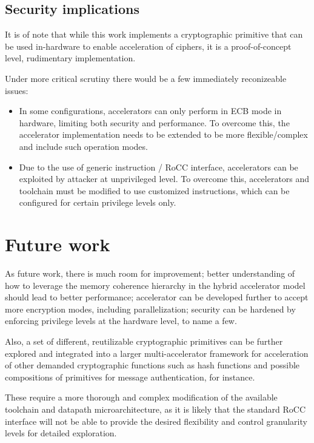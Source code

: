 \documentclass[10pt,conference]{IEEEtran}
\begin{document}
\subsection{Security implications}

It is of note that while this work implements a cryptographic primitive that can
be used in-hardware to enable acceleration of ciphers, it is a proof-of-concept
level, rudimentary implementation.

Under more critical scrutiny there would be a few immediately reconizeable
issues:

\begin{itemize}
  \item In some configurations, accelerators can only perform in ECB mode in
    hardware, limiting both security and performance. To overcome this, the
    accelerator implementation needs to be extended to be more flexible/complex
    and include such operation modes.
  \item Due to the use of generic instruction / RoCC interface, accelerators
    can be exploited by attacker at unprivileged level. To overcome this,
    accelerators and toolchain must be modified to use customized instructions,
    which can be configured for certain privilege levels only.
\end{itemize}

\section{Future work}

As future work, there is much room for improvement; better understanding of how
to leverage the memory coherence hierarchy in the hybrid accelerator model
should lead to better performance; accelerator can be developed further to
accept more encryption modes, including parallelization; security can be
hardened by enforcing privilege levels at the hardware level, to name a few.

Also, a set of different, reutilizable cryptographic primitives can be further
explored and integrated into a larger multi-accelerator framework for
acceleration of other demanded cryptographic functions such as hash functions
and possible compositions of primitives for message authentication, for instance.

These require a more thorough and complex modification of the available
toolchain and datapath microarchitecture, as it is likely that the standard RoCC
interface will not be able to provide the desired flexibility and control
granularity levels for detailed exploration.
\end{document}
